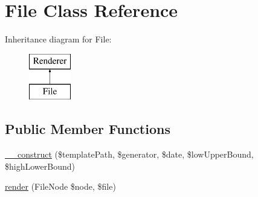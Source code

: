\hypertarget{class_sebastian_bergmann_1_1_code_coverage_1_1_report_1_1_html_1_1_file}{}\section{File Class Reference}
\label{class_sebastian_bergmann_1_1_code_coverage_1_1_report_1_1_html_1_1_file}
Inheritance diagram for File\+:\begin{figure}[H]
\begin{center}
\leavevmode
\includegraphics[height=2.000000cm]{class_sebastian_bergmann_1_1_code_coverage_1_1_report_1_1_html_1_1_file}
\end{center}
\end{figure}
\subsection*{Public Member Functions}
\begin{DoxyCompactItemize}
\item 
\mbox{\hyperlink{class_sebastian_bergmann_1_1_code_coverage_1_1_report_1_1_html_1_1_file_a51e93af278248ccd1d16725b156b0a36}{\+\_\+\+\_\+construct}} (\$template\+Path, \$generator, \$date, \$low\+Upper\+Bound, \$high\+Lower\+Bound)
\item 
\mbox{\hyperlink{class_sebastian_bergmann_1_1_code_coverage_1_1_report_1_1_html_1_1_file_ad4c30a5a61282c5351132ba86d5e0c26}{render}} (File\+Node \$node, \$file)
\end{DoxyCompactItemize}
